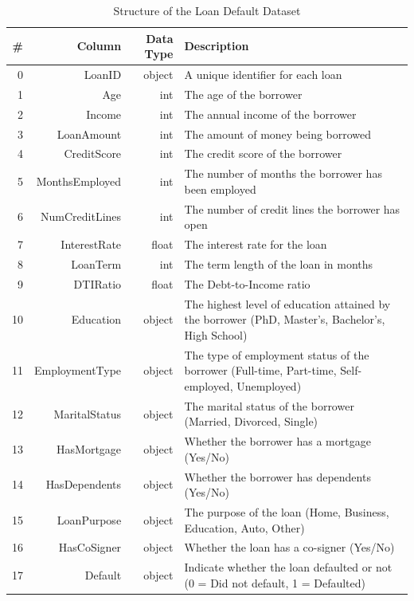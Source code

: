 \documentclass[12pt]{article}
\begin{document}
\begin{table}[tbp]
  \caption{Structure of the Loan Default Dataset}
  \label{tab:rv}
\centering
\begin{tabular}{rrrp{3.5in}}
  \toprule
# & Column & Data Type & Description \\ 
  \midrule
0 & LoanID & object & A unique identifier for each loan \\ 
  1 & Age & int & The age of the borrower \\ 
  2 & Income & int & The annual income of the borrower \\ 
  3 & LoanAmount & int & The amount of money being borrowed \\ 
  4 & CreditScore & int & The credit score of the borrower \\ 
  5 & MonthsEmployed & int & The number of months the borrower has been employed \\ 
  6 & NumCreditLines & int & The number of credit lines the borrower has open \\ 
  7 & InterestRate & float & The interest rate for the loan \\ 
  8 & LoanTerm & int & The term length of the loan in months \\ 
  9 & DTIRatio & float & The Debt-to-Income ratio \\
  10 & Education & object & The highest level of education attained by the borrower (PhD, Master's, Bachelor's, High School) \\
  11 & EmploymentType & object & The type of employment status of the borrower (Full-time, Part-time, Self-employed, Unemployed) \\
  12 & MaritalStatus & object & The marital status of the borrower (Married, Divorced, Single) \\
  13 & HasMortgage & object & Whether the borrower has a mortgage (Yes/No) \\
  14 & HasDependents & object & Whether the borrower has dependents (Yes/No) \\
  15 & LoanPurpose & object & The purpose of the loan (Home, Business, Education, Auto, Other) \\
  16 & HasCoSigner & object & Whether the loan has a co-signer (Yes/No) \\
  17 & Default & object & Indicate whether the loan defaulted or not (0 = Did not default, 1 = Defaulted) \\ 
   \bottomrule
\end{tabular}
\end{table}
\end{document}

